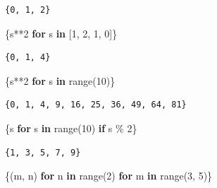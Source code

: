 \documentclass[
  spanish,
  letterpaper,
]{scrbook}
\newenvironment{Shaded}{\begin{snugshade}}{\end{snugshade}}
\newcommand{\BuiltInTok}[1]{\textcolor[rgb]{0.00,0.23,0.31}{#1}}
\newcommand{\ControlFlowTok}[1]{\textcolor[rgb]{0.00,0.23,0.31}{\textbf{#1}}}
\newcommand{\DecValTok}[1]{\textcolor[rgb]{0.68,0.00,0.00}{#1}}
\newcommand{\KeywordTok}[1]{\textcolor[rgb]{0.00,0.23,0.31}{\textbf{#1}}}
\newcommand{\NormalTok}[1]{\textcolor[rgb]{0.00,0.23,0.31}{#1}}
\newcommand{\OperatorTok}[1]{\textcolor[rgb]{0.37,0.37,0.37}{#1}}
\theoremstyle{definition}
\theoremstyle{remark}
\begin{document}
\begin{verbatim}
{0, 1, 2}
\end{verbatim}

\begin{Shaded}
\begin{Highlighting}[]
\NormalTok{\{s}\OperatorTok{**}\DecValTok{2} \ControlFlowTok{for}\NormalTok{ s }\KeywordTok{in}\NormalTok{ [}\DecValTok{1}\NormalTok{, }\DecValTok{2}\NormalTok{, }\DecValTok{1}\NormalTok{, }\DecValTok{0}\NormalTok{]\}}
\end{Highlighting}
\end{Shaded}

\begin{verbatim}
{0, 1, 4}
\end{verbatim}

\begin{Shaded}
\begin{Highlighting}[]
\NormalTok{\{s}\OperatorTok{**}\DecValTok{2} \ControlFlowTok{for}\NormalTok{ s }\KeywordTok{in} \BuiltInTok{range}\NormalTok{(}\DecValTok{10}\NormalTok{)\}}
\end{Highlighting}
\end{Shaded}

\begin{verbatim}
{0, 1, 4, 9, 16, 25, 36, 49, 64, 81}
\end{verbatim}

\begin{Shaded}
\begin{Highlighting}[]
\NormalTok{\{s }\ControlFlowTok{for}\NormalTok{ s }\KeywordTok{in} \BuiltInTok{range}\NormalTok{(}\DecValTok{10}\NormalTok{) }\ControlFlowTok{if}\NormalTok{ s }\OperatorTok{\%} \DecValTok{2}\NormalTok{\}}
\end{Highlighting}
\end{Shaded}

\begin{verbatim}
{1, 3, 5, 7, 9}
\end{verbatim}

\begin{Shaded}
\begin{Highlighting}[]
\NormalTok{\{(m, n) }\ControlFlowTok{for}\NormalTok{ n }\KeywordTok{in} \BuiltInTok{range}\NormalTok{(}\DecValTok{2}\NormalTok{) }\ControlFlowTok{for}\NormalTok{ m }\KeywordTok{in} \BuiltInTok{range}\NormalTok{(}\DecValTok{3}\NormalTok{, }\DecValTok{5}\NormalTok{)\}}
\end{Highlighting}
\end{Shaded}
\end{document}
